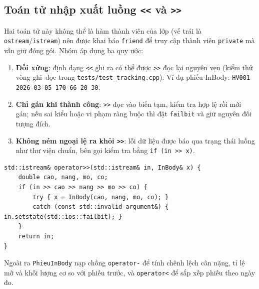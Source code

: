 \subsection{Toán tử nhập xuất luồng \texttt{<<} và \texttt{>>}}
Hai toán tử này không thể là hàm thành viên của lớp (vế trái là \texttt{ostream}/\texttt{istream}) nên được khai báo \texttt{friend} để truy cập thành viên \texttt{private} mà vẫn giữ đóng gói. Nhóm áp dụng ba quy ước:
\begin{enumerate}[leftmargin=*]
  \item \textbf{Đối xứng}: định dạng \texttt{<<} ghi ra có thể được \texttt{>>} đọc lại nguyên vẹn (kiểm thử vòng ghi--đọc trong \texttt{tests/test\_tracking.cpp}). Ví dụ phiếu InBody: \texttt{HV001 2026-03-05 170 66 20 30}.
  \item \textbf{Chỉ gán khi thành công}: \texttt{>>} đọc vào biến tạm, kiểm tra hợp lệ rồi mới gán; nếu sai kiểu hoặc vi phạm ràng buộc thì đặt \texttt{failbit} và giữ nguyên đối tượng đích.
  \item \textbf{Không ném ngoại lệ ra khỏi \texttt{>>}}: lỗi dữ liệu được báo qua trạng thái luồng như thư viện chuẩn, bên gọi kiểm tra bằng \texttt{if (in >> x)}.
\end{enumerate}
\begin{lstlisting}
std::istream& operator>>(std::istream& in, InBody& x) {
    double cao, nang, mo, co;
    if (in >> cao >> nang >> mo >> co) {
        try { x = InBody(cao, nang, mo, co); }
        catch (const std::invalid_argument&) { in.setstate(std::ios::failbit); }
    }
    return in;
}
\end{lstlisting}
Ngoài ra \texttt{PhieuInBody} nạp chồng \texttt{operator-} để tính chênh lệch cân nặng, tỉ lệ mỡ và khối lượng cơ so với phiếu trước, và \texttt{operator<} để sắp xếp phiếu theo ngày đo.

